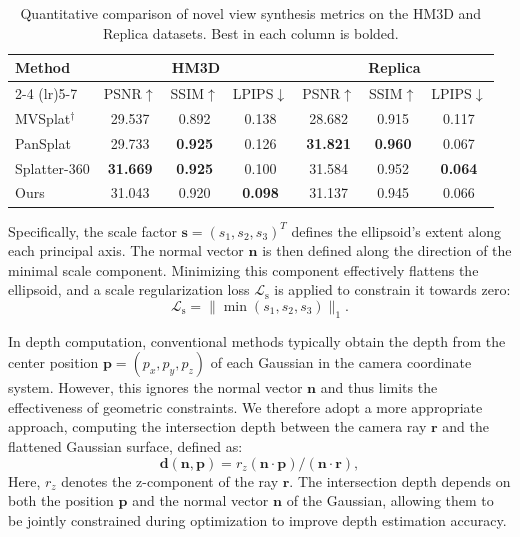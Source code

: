 \renewcommand{\arraystretch}{0.75} 
\begin{table}[htbp]
  \scriptsize
  \centering
    \caption{Quantitative comparison of novel view synthesis metrics on the HM3D and Replica datasets. Best in each column is bolded.}
  \label{tab:render}
  \setlength{\tabcolsep}{13pt}  
  \begin{tabular}{lcccccc}
    \toprule
    \multirow{2}{*}{Method}  & \multicolumn{3}{c}{HM3D} & \multicolumn{3}{c}{Replica} \\
    \cmidrule(lr){2-4} \cmidrule(lr){5-7}
           & PSNR$\uparrow$ & SSIM$\uparrow$ & LPIPS$\downarrow$
           & PSNR$\uparrow$ & SSIM$\uparrow$ & LPIPS$\downarrow$ \\
    \midrule
    MVSplat$^\dagger$ & 29.537 & 0.892 & 0.138  & 28.682 & 0.915 & 0.117 \\ 
    PanSplat     & 29.733 & \textbf{0.925} & 0.126 & \textbf{31.821} & \textbf{0.960} & 0.067 \\
    Splatter-360  & \textbf{31.669} & \textbf{0.925} & 0.100 & 31.584 & 0.952 & \textbf{0.064} \\
    Ours & 31.043 & 0.920 & \textbf{0.098} & 31.137 & 0.945 & 0.066 \\
    \bottomrule
  \end{tabular}
  \setlength{\tabcolsep}{6pt}
\end{table}

Specifically, the scale factor $\mathbf{s}=(s_1,s_2,s_3)^T$ defines the ellipsoid’s extent along each principal axis. The normal vector $\mathbf{n}$ is then defined along the direction of the minimal scale component. Minimizing this component effectively flattens the ellipsoid, and a scale regularization loss $\mathcal{L}_\mathrm{s}$ is applied to constrain it towards zero:
\begin{equation}\label{equ:6}
\mathcal{L}_\mathrm{s}=\|\min(s_1,s_2,s_3)\|_1.\end{equation}

In depth computation, conventional methods typically obtain the depth from the center position $\textbf{p}=(p_x,p_y,p_z)$ of each Gaussian in the camera coordinate system. However, this ignores the normal vector $\textbf{n}$ and thus limits the effectiveness of geometric constraints. We therefore adopt a more appropriate approach, computing the intersection depth between the camera ray $\textbf{r}$ and the flattened Gaussian surface, defined as:
\begin{equation}\label{equ:7}
\mathbf{d}(\mathbf{n},\mathbf{p})={r_z(\mathbf{n}\cdot \mathbf{p})}/{(\mathbf{n}\cdot \mathbf{r})},
\end{equation}
Here, $r_z$ denotes the z-component of the ray $\textbf{r}$. The intersection depth depends on both the position $\textbf{p}$ and the normal vector $\textbf{n}$ of the Gaussian, allowing them to be jointly constrained during optimization to improve depth estimation accuracy.

